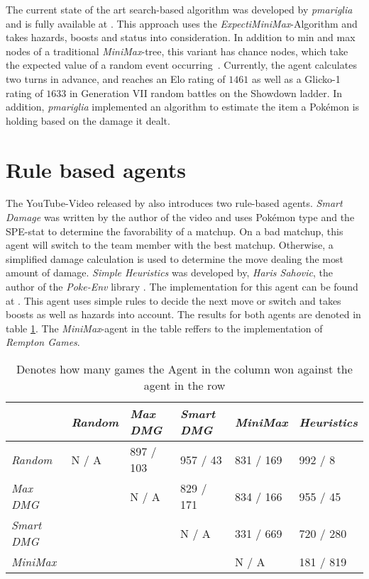 The current state of the art search-based algorithm was developed by \emph{pmariglia} and is fully available
at \cite{Github:pmariglia-showdown}. This approach uses the \textit{ExpectiMiniMax}-Algorithm and takes
hazards, boosts and status into consideration. In addition to \grqq min\grqq{}
and \grqq max\grqq{} nodes of a traditional \textit{MiniMax}-tree, this variant has \grqq chance\grqq{} nodes, which take the 
expected value of a random event occurring~\autocite{wiki:Expectiminimax}. Currently, the agent calculates two turns in
advance, and reaches an Elo rating of $1461$ as well as a Glicko-1 rating of $1633$ in Generation VII random battles 
on the Showdown ladder. 
In addition, \emph{pmariglia} implemented an algorithm to estimate the item a Pokémon is holding
based on the damage it dealt. 

\section{Rule based agents}
\label{sec:related-rulebased}
The YouTube-Video released by \cite{RemptonGames:PokemonAI} also introduces two rule-based agents.
\textit{Smart Damage} was written by the author of the video and uses Pokémon type and the \ac{SPE}-stat to determine
the favorability of a matchup. On a bad matchup, this agent will switch to the team member with the best matchup. Otherwise,
a simplified damage calculation is used to determine the move dealing the most amount of damage. \textit{Simple 
Heuristics} was developed by, \emph{Haris Sahovic}, the author of the \emph{Poke-Env} library \cite{PokeEnv:Github}.
The implementation for this agent can be found at \cite{PokeEnv:Baselines}. This agent uses simple rules
to decide the next move or switch and takes boosts as well as hazards into account. The results for both agents
are denoted in table \ref{tbl:Youtube-Results}. The \textit{MiniMax}-agent in the table reffers to the implementation
of \emph{Rempton Games}.
\begin{table}[h]
    \centering
        \begin{tabular}{|l|l|l|l|l|l|}
            \hline
            & \emph{Random} & \emph{Max \ac{DMG}} & \emph{Smart \ac{DMG}} & \emph{MiniMax} & \emph{Heuristics} \\
            \hline
            \emph{Random} & N / A & 897 / 103 & 957 / 43 & 831 / 169 & 992 / 8 \\
            \hline
            \emph{Max \ac{DMG}} & & N / A & 829 / 171 & 834 / 166 & 955 / 45 \\
            \hline
            \emph{Smart \ac{DMG}} & & & N / A & 331 / 669 & 720 / 280 \\
            \hline
            \emph{MiniMax} & & & & N / A & 181 / 819 \\
            \hline 
        \end{tabular}
        \caption{Denotes how many games the Agent in the column won against the agent in the row \cite{RemptonGames:PokemonAI}}
        \label{tbl:Youtube-Results}
\end{table}

